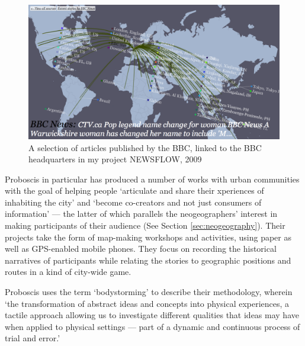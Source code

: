 \documentclass[11pt,oneside,notitlepage]{report}
\begin{document}
\begin{figure}[h]
	\begin{center}
		\includegraphics[width=1\textwidth]{images/newsflow.png}
		\caption{A selection of articles published by the BBC, linked to the BBC headquarters in my project NEWSFLOW, 2009}
	\end{center}
\end{figure}

Proboscis in particular has produced a number of works with urban communities with the goal of helping people `articulate and share their xperiences of inhabiting the city' and `become co-creators and not just consumers of information' --- the latter of which parallels the neogeographers' interest in making participants of their audience (See Section \ref{sec:neogeography}). Their projects take the form of map-making workshops and activities, using paper as well as GPS-enabled mobile phones. They focus on recording the historical narratives of participants while relating the stories to geographic positions and routes in a kind of city-wide game. 

Proboscis uses the term `bodystorming' to describe their methodology, wherein `the transformation of abstract ideas and concepts into physical experiences, a tactile approach allowing us to investigate different qualities that ideas may have when applied to physical settings --- part of a dynamic and continuous process of trial and error.' \cite{proboscis2003bodystorming} 



\end{document}
